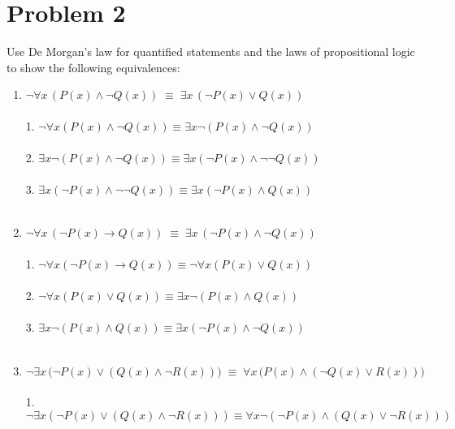 \documentclass{amsart}
\theoremstyle{definition}
\theoremstyle{Exercise}
\theoremstyle{remark}
\theoremstyle{rule}
\numberwithin{equation}{section}
\begin{document}
\newpage


\section*{Problem 2}

Use De Morgan's law for quantified statements and the laws of propositional logic to show the following equivalences:\\
\begin{enumerate}[label=(\alph*)]
\item $\neg \forall x \, \left(P(x) \land \neg Q(x) \right)\; \equiv \; \exists x \, \left(\neg P(x) \lor  Q(x) \right)$\\\\
1. $\neg \forall x (P(x) \land \neg Q(x)) \equiv \exists x \neg (P(x) \land \neg Q(x))$\\\\
2. $\exists x \neg (P(x) \land \neg Q(x)) \equiv \exists x (\neg P(x) \land \neg \neg Q(x))$\\\\
3. $\exists x (\neg P(x) \land \neg \neg Q(x)) \equiv \exists x (\neg P(x) \land Q(x))$
\\\\
\item $\neg \forall x \, \left(\neg P(x) \to Q(x) \right)\; \equiv \; \exists x \, \left(\neg P(x) \land  \neg Q(x) \right)$\\\\
1. $\neg \forall x (\neg P(x) \to Q(x)) \equiv \neg \forall x (P(x) \lor Q(x))$\\\\
2. $\neg \forall x (P(x) \lor Q(x)) \equiv \exists x \neg (P(x) \land Q(x))$\\\\
3. $\exists x \neg (P(x) \land Q(x)) \equiv \exists x (\neg P(x) \land \neg Q(x))$
\\\\
\item $\neg \exists x \, \big(\neg P(x) \lor \left(Q(x) \land \neg R(x) \right)\big)\; \equiv \; \forall x \,\big( P(x) \land \left( \neg Q(x) \lor R(x) \right)\big)$\\\\
1. $\neg \exists x (\neg P(x) \lor (Q(x) \land \neg R(x))) \equiv \forall x \neg (\neg P(x) \land (Q(x) \lor \neg R(x)))$\\\\

\end{enumerate}
\end{document}
